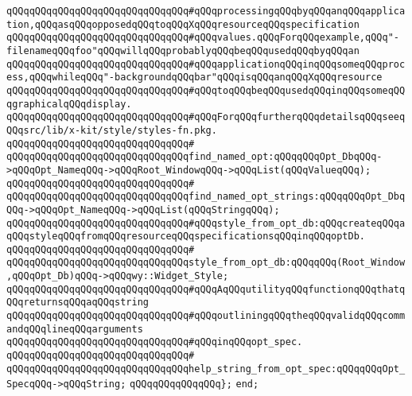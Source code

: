 \verb|qQQqqQQqqQQqqQQqqQQqqQQqqQQqqQQq#qQQqprocessingqQQqbyqQQqanqQQqapplication,qQQqasqQQqopposedqQQqtoqQQqXqQQqresourceqQQqspecification|\newline
\verb|qQQqqQQqqQQqqQQqqQQqqQQqqQQqqQQq#qQQqvalues.qQQqForqQQqexample,qQQq"-filenameqQQqfoo"qQQqwillqQQqprobablyqQQqbeqQQqusedqQQqbyqQQqan|\newline
\verb|qQQqqQQqqQQqqQQqqQQqqQQqqQQqqQQq#qQQqapplicationqQQqinqQQqsomeqQQqprocess,qQQqwhileqQQq"-backgroundqQQqbar"qQQqisqQQqanqQQqXqQQqresource|\newline
\verb|qQQqqQQqqQQqqQQqqQQqqQQqqQQqqQQq#qQQqtoqQQqbeqQQqusedqQQqinqQQqsomeqQQqgraphicalqQQqdisplay.|\newline
\verb|qQQqqQQqqQQqqQQqqQQqqQQqqQQqqQQq#qQQqForqQQqfurtherqQQqdetailsqQQqseeqQQqsrc/lib/x-kit/style/styles-fn.pkg.|\newline
\verb|qQQqqQQqqQQqqQQqqQQqqQQqqQQqqQQq#|\newline
\verb|qQQqqQQqqQQqqQQqqQQqqQQqqQQqqQQqfind_named_opt:qQQqqQQqOpt_DbqQQq->qQQqOpt_NameqQQq->qQQqRoot_WindowqQQq->qQQqList(qQQqValueqQQq);|\newline
\verb|qQQqqQQqqQQqqQQqqQQqqQQqqQQqqQQq#|\newline
\verb|qQQqqQQqqQQqqQQqqQQqqQQqqQQqqQQqfind_named_opt_strings:qQQqqQQqOpt_DbqQQq->qQQqOpt_NameqQQq->qQQqList(qQQqStringqQQq);|\newline
\newline
\verb|qQQqqQQqqQQqqQQqqQQqqQQqqQQqqQQq#qQQqstyle_from_opt_db:qQQqcreateqQQqaqQQqstyleqQQqfromqQQqresourceqQQqspecificationsqQQqinqQQqoptDb.|\newline
\verb|qQQqqQQqqQQqqQQqqQQqqQQqqQQqqQQq#|\newline
\verb|qQQqqQQqqQQqqQQqqQQqqQQqqQQqqQQqstyle_from_opt_db:qQQqqQQq(Root_Window,qQQqOpt_Db)qQQq->qQQqwy::Widget_Style;|\newline
\newline
\verb|qQQqqQQqqQQqqQQqqQQqqQQqqQQqqQQq#qQQqAqQQqutilityqQQqfunctionqQQqthatqQQqreturnsqQQqaqQQqstring|\newline
\verb|qQQqqQQqqQQqqQQqqQQqqQQqqQQqqQQq#qQQqoutliningqQQqtheqQQqvalidqQQqcommandqQQqlineqQQqarguments|\newline
\verb|qQQqqQQqqQQqqQQqqQQqqQQqqQQqqQQq#qQQqinqQQqopt_spec.|\newline
\verb|qQQqqQQqqQQqqQQqqQQqqQQqqQQqqQQq#|\newline
\verb|qQQqqQQqqQQqqQQqqQQqqQQqqQQqqQQqhelp_string_from_opt_spec:qQQqqQQqOpt_SpecqQQq->qQQqString;|\newline
\verb|qQQqqQQqqQQqqQQq};|\newline
\newline
\verb|end;|\newline

